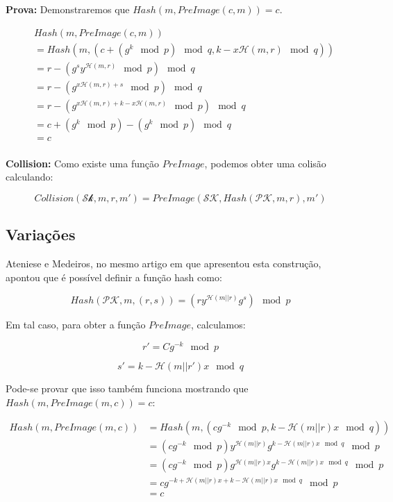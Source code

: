 \documentclass[a4paper]{article}
\begin{document}
 \textbf{Prova: }Demonstraremos que $Hash(m, PreImage(c, m)) = c$.
 
 \begin{equation*}
 \begin{split}
 &Hash(m, PreImage(c, m))\\
 &= Hash(m, (c+(g^k \mod p) \mod q, k-x\mathcal{H}(m, r) \mod q))\\
 &= r - (g^sy^{\mathcal{H}(m, r)} \mod p) \mod q\\
 &= r - (g^{x\mathcal{H}(m, r) + s} \mod p) \mod q\\
 &= r - (g^{x\mathcal{H}(m, r) + k - x\mathcal{H}(m, r)} \mod p) \mod q\\
 &= c+ (g^k \mod p) - (g^{k} \mod p) \mod q\\
 &= c\\
 \end{split}
 \end{equation*}
 
 
 
 \textbf{Collision:} Como existe uma função $PreImage$, podemos
 obter uma colisão calculando:
 
 $$ Collision(\mathcal{Sk}, m, r, m') = PreImage(\mathcal{SK},
 Hash(\mathcal{PK}, m, r), m')
 $$
 
 \subsection{Variações}
 
 Ateniese e Medeiros, no mesmo artigo em que apresentou esta construção,
 apontou que é possível definir a função hash como:
 
 $$ Hash(\mathcal{PK}, m, (r, s)) =
 \left(ry^{\mathcal{H}(m||r)}g^{s} \right)\mod p
 $$
 
 Em tal caso, para obter a função $PreImage$, calculamos:
 
 $$
 r'=Cg^{-k} \mod p
 $$
 
 $$
 s' = k-\mathcal{H}(m||r')x \mod q
 $$
 
 Pode-se provar que isso também funciona mostrando que $Hash(m,
 PreImage(m, c))=c$:
 
 \begin{equation}
 \begin{split}
 Hash(m, PreImage(m, c))
 &= Hash(m, (cg^{-k} \mod p, k-\mathcal{H}(m||r)x \mod q))\\
 &= (cg^{-k} \mod p)y^{\mathcal{H}(m||r)}g^{k-\mathcal{H}(m||r)x\mod q}\mod p\\
 &= (cg^{-k} \mod p)g^{\mathcal{H}(m||r)x}g^{k-\mathcal{H}(m||r)x\mod q}\mod p\\
 &= cg^{-k+\mathcal{H}(m||r)x+k-\mathcal{H}(m||r)x \mod q} \mod p\\
 &= c\\
 \end{split}
 \end{equation}
 
\end{document}
